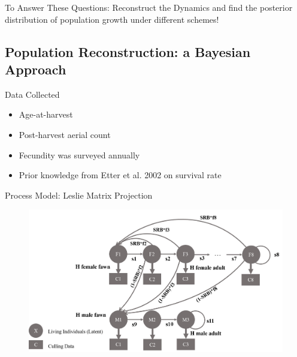 \documentclass{beamer}
\begin{document}
\begin{frame}{To Answer These Questions:}
	Reconstruct the Dynamics and find the posterior distribution of population growth under different schemes!
\end{frame}

\subsection{Population Reconstruction: a Bayesian Approach}

\begin{frame}{Data Collected}
\renewcommand\baselinestretch{1.25}\selectfont
\begin{itemize}
	\item Age-at-harvest
	\item Post-harvest aerial count
	\item Fecundity was surveyed annually
	\item Prior knowledge from Etter et al. 2002 on survival rate
	
\end{itemize}
\renewcommand\baselinestretch{1}\selectfont
\end{frame}

\begin{frame}{Process Model: Leslie Matrix Projection}
\begin{figure}[ht]
	\centering
	\includegraphics[width=\textwidth]{fig/Chicago_deer/LHD.jpg}
	\label{LHD}
\end{figure}
\end{frame}
\end{document}
